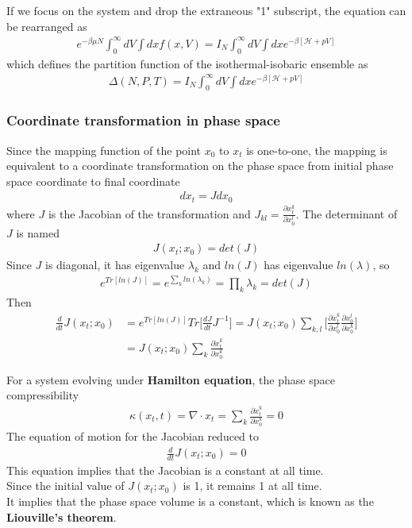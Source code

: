 \documentclass{beamer}
\begin{document}
\begin{frame}
\fontsize{9pt}{10pt}\selectfont
If we focus on the system and drop the extraneous "1" subscript, the equation can be rearranged as
\begin{align}
e^{-\beta\mu N}\int^{\infty}_0dV\int dxf(x,V)=I_N\int^{\infty}_0dV\int dxe^{-\beta[\mathscr{H}+pV]}
\end{align}
which defines the partition function of the isothermal-isobaric ensemble as
\begin{align}
\Delta(N,P,T)=I_N\int^{\infty}_0dV\int dxe^{-\beta[\mathscr{H}+pV]}
\end{align}
\end{frame}
\begin{frame}
\frametitle{Coordinate transformation in phase space}
\fontsize{9pt}{10pt}\selectfont
Since the mapping function of the point $x_0$ to $x_t$ is one-to-one, the mapping is equivalent to a coordinate transformation on the phase space from initial phase space coordinate to final coordinate
\begin{align}
dx_t= Jdx_0
\end{align}
where $J$ is the Jacobian of the transformation and $J_{kl}=\frac{\partial x^k_t}{\partial x^l_0}$. The determinant of $J$ is named
\begin{align}
J(x_t;x_0)=det(J)
\end{align}
Since $J$ is diagonal, it has eigenvalue $\lambda_k$ and $ln(J)$ has eigenvalue $ln(\lambda)$, so
\begin{align}
e^{Tr[ln(J)]}=e^{\sum_kln(\lambda_k)}=\prod_k\lambda_k=det(J)
\end{align}
Then
\begin{align}
\frac{d}{dt}J(x_t;x_0)&=e^{Tr[ln(J)]}Tr\bigg[\frac{dJ}{dt}J^{-1}\bigg]=J(x_t;x_0)\sum_{k,l}\bigg[\frac{\partial\dot{x}^k_t}{\partial x^l_0}\frac{\partial x^l_0}{\partial x^k_0}\bigg]\nonumber\\
&=J(x_t;x_0)\sum_k\frac{\partial\dot{x}^k_t}{\partial x^k_0}
\end{align}
\end{frame}
\begin{frame}
\fontsize{9pt}{10pt}\selectfont
For a system evolving under \textbf{Hamilton equation}, the phase space compressibility 
\begin{align}
\kappa(x_t,t)=\nabla\cdot x_t=\sum_k\frac{\partial\dot{x}^k_t}{\partial x^k_0}=0
\end{align}
The equation of motion for the Jacobian reduced to
\begin{align}
\frac{d}{dt}J(x_t;x_0)=0
\end{align}
This equation implies that the Jacobian is a constant at all time.\\ Since the initial value of $J(x_t;x_0)$ is 1, it remains 1 at all time. \\
It implies that the phase space volume is a constant, which is known as the \textbf{Liouville's theorem}.
\end{frame}
\end{document}

